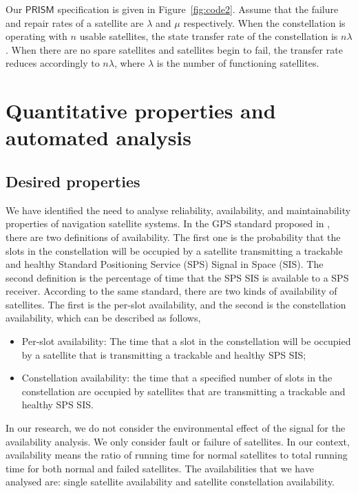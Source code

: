 \documentclass[preprint,12pt]{qrei}
\begin{document}
Our $\mathsf{PRISM}$ specification is given in Figure~\ref{fig:code2}. Assume that the failure and repair rates of a satellite are ${\lambda}$ and ${\mu}$ respectively. When the constellation is operating with $n$ usable satellites, the state transfer rate of the constellation is $n\lambda$. When there are no spare satellites and satellites begin to fail, the transfer rate reduces accordingly to $n\lambda$, where $\lambda$ is the number of functioning satellites.



\section{Quantitative properties and automated analysis}
\label{sect:lspar}

\subsection{Desired properties}

We have identified the need to analyse reliability, availability, and maintainability properties of navigation satellite systems. In the GPS standard proposed in \cite{SIS08}, there are two definitions of availability. The first one is the probability that the slots in the constellation will be occupied by a satellite transmitting a trackable and healthy Standard Positioning Service (SPS) Signal in Space (SIS). The second definition is the percentage of time that the SPS SIS is available to a SPS receiver. According to the same standard, there are two kinds of availability of satellites. The first is the per-slot availability, and the second is the constellation availability, which can be described as follows,

\begin{itemize}
\item Per-slot availability: The time that a slot in the constellation will be occupied by a satellite that is transmitting a trackable and healthy SPS SIS;
\item Constellation availability: the time that a specified number of slots in the constellation are occupied by satellites that are transmitting a trackable and healthy SPS SIS.
\end{itemize}

In our research, we do not consider the environmental effect of the signal for the availability analysis. We only consider fault or failure of satellites. In our context, availability means the ratio of running time for normal satellites to total running time for both normal and failed satellites. The availabilities that we have analysed are: single satellite availability and satellite constellation availability.
\end{document}
